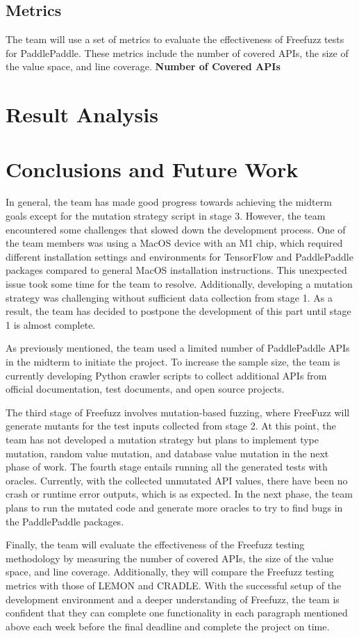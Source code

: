 \documentclass[sigconf]{acmart}
\begin{document}
  \subsection{Metrics}
  The team will use a set of metrics to evaluate the effectiveness of Freefuzz tests for PaddlePaddle. 
  These metrics include the number of covered APIs, the size of the value space, and line coverage.
  \textbf{Number of Covered APIs}

  \section{Result Analysis}


\section{Conclusions and Future Work}
In general, the team has made good progress towards achieving the midterm goals except for the mutation strategy script in stage 3. However, the team encountered some challenges that slowed down the development process. One of the team members was using a MacOS device with an M1 chip, which required different installation settings and environments for TensorFlow and PaddlePaddle packages compared to general MacOS installation instructions. This unexpected issue took some time for the team to resolve. Additionally, developing a mutation strategy was challenging without sufficient data collection from stage 1. As a result, the team has decided to postpone the development of this part until stage 1 is almost complete.
\par As previously mentioned, the team used a limited number of PaddlePaddle APIs in the midterm to initiate the project. To increase the sample size, the team is currently developing Python crawler scripts to collect additional APIs from official documentation, test documents, and open source projects.
\par The third stage of Freefuzz involves mutation-based fuzzing, where FreeFuzz will generate mutants for the test inputs collected from stage 2. At this point, the team has not developed a mutation strategy but plans to implement type mutation, random value mutation, and database value mutation in the next phase of work. The fourth stage entails running all the generated tests with oracles. Currently, with the collected unmutated API values, there have been no crash or runtime error outputs, which is as expected. In the next phase, the team plans to run the mutated code and generate more oracles to try to find bugs in the PaddlePaddle packages.
\par Finally, the team will evaluate the effectiveness of the Freefuzz testing methodology by measuring the number of covered APIs, the size of the value space, and line coverage. Additionally, they will compare the Freefuzz testing metrics with those of LEMON and CRADLE.
With the successful setup of the development environment and a deeper understanding of Freefuzz, the team is confident that they can complete one functionality in each paragraph mentioned above each week before the final deadline and complete the project on time.
\end{document}
